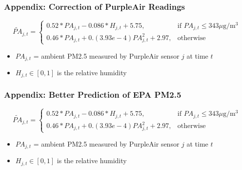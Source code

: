 \documentclass{beamer}
\begin{document}
\begin{frame}
\frametitle{Appendix: Correction of PurpleAir Readings}
$$
\widetilde{PA}_{j,t}=\begin{cases}
			0.52*PA_{j,t} - 0.086*H_{j,t} + 5.75, & \text{if $PA_{j,t} \leq 343 \mu$g/m$^3$}\\
            0.46*PA_{j,t} + 0.(3.93e-4)PA_{j,t}^2 + 2.97, & \text{otherwise}
		 \end{cases}
$$
\begin{itemize}
    \item $PA_{j,t}$ = ambient PM2.5 measured by PurpleAir sensor $j$ at time $t$
    \item $H_{j,t}\in[0,1]$ is the relative humidity
\end{itemize}
\end{frame}


\begin{frame}
\frametitle{Appendix: Better Prediction of EPA PM2.5}

$$
\widetilde{PA}_{j,t}=\begin{cases}
			0.52*PA_{j,t} - 0.086*H_{j,t} + 5.75, & \text{if $PA_{j,t} \leq 343 \mu$g/m$^3$}\\
            0.46*PA_{j,t} + 0.(3.93e-4)PA_{j,t}^2 + 2.97, & \text{otherwise}
		 \end{cases}
$$
\begin{itemize}
    \item $PA_{j,t}$ = ambient PM2.5 measured by PurpleAir sensor $j$ at time $t$
    \item $H_{j,t}\in[0,1]$ is the relative humidity
\end{itemize}
\end{frame}
\end{document}
